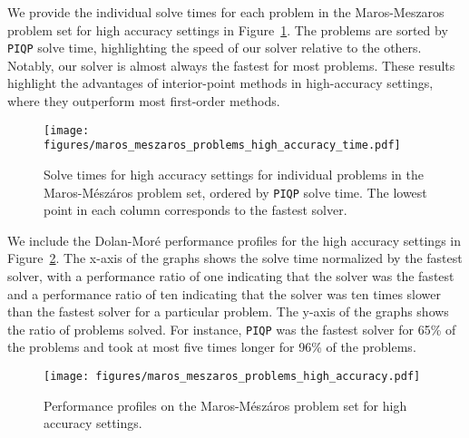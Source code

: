 \documentclass[letterpaper, 10 pt, conference]{ieeeconf}  \IEEEoverridecommandlockouts
\begin{document}
We provide the individual solve times for each problem in the Maros-Meszaros problem set for high accuracy settings in Figure~\ref{fig:maros_meszaros_problems_high_accuracy_time}. The problems are sorted by \texttt{PIQP} solve time, highlighting the speed of our solver relative to the others. Notably, our solver is almost always the fastest for most problems. These results highlight the advantages of interior-point methods in high-accuracy settings, where they outperform most first-order methods.
\begin{figure}[htbp!]
\centering
\texttt{[image: figures/maros\_meszaros\_problems\_high\_accuracy\_time.pdf]}
\vspace{-0.5cm}
\caption{Solve times for high accuracy settings for individual problems in the Maros-Mészáros problem set, ordered by \texttt{PIQP} solve time. The lowest point in each column corresponds to the fastest solver.}
\label{fig:maros_meszaros_problems_high_accuracy_time}
\end{figure}

We include the Dolan-Moré performance profiles \cite{dolan2002} for the high accuracy settings in Figure~\ref{fig:maros_meszaros_problems_high}. The x-axis of the graphs shows the solve time normalized by the fastest solver, with a performance ratio of one indicating that the solver was the fastest and a performance ratio of ten indicating that the solver was ten times slower than the fastest solver for a particular problem. The y-axis of the graphs shows the ratio of problems solved. For instance, \texttt{PIQP} was the fastest solver for 65\% of the problems and took at most five times longer for 96\% of the problems.
\begin{figure}[htbp!]
\centering
\texttt{[image: figures/maros\_meszaros\_problems\_high\_accuracy.pdf]}
\vspace{-0.5cm}
\caption{Performance profiles on the Maros-Mészáros problem set for high accuracy settings.}
\label{fig:maros_meszaros_problems_high}
\end{figure}








\end{document}
